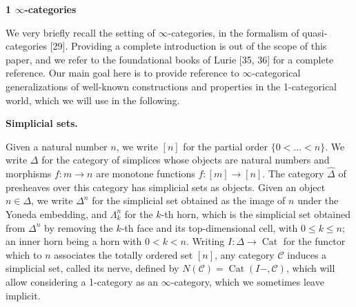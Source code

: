 \documentclass[10pt,a4paper]{article}
\begin{document}
 
 


 
\par\medskip\noindent\textbf{1 $\infty$-categories}\par
 
 
We very briefly recall the setting of $\infty$-categories, in the formalism of quasi-categories [29]. Providing a complete introduction is out of the scope of this paper, and we refer to the foundational books of Lurie [35, 36] for a complete reference. Our main goal here is to provide reference to $\infty$-categorical generalizations of well-known constructions and properties in the 1-categorical world, which we will use in the following.\par
 
 
 
\par\medskip\noindent\textbf{Simplicial sets.}\par
 
 
Given a natural number $n$, we write $[n]$ for the partial order $\{0<\ldots<n\}$. We write $\Delta$ for the category of simplices whose objects are natural numbers and morphisms $f:m\to n$ are monotone functions $f:[m]\to[n]$. The category $\widehat{\Delta}$ of presheaves over this category has simplicial sets as objects. Given an object $n\in\Delta$, we write $\Delta^{n}$ for the simplicial set obtained as the image of $n$ under the Yoneda embedding, and $\Lambda^{n}_{k}$ for the $k$-th horn, which is the simplicial set obtained from $\Delta^{n}$ by removing the $k$-th face and its top-dimensional cell, with $0\leq k\leq n$; an inner horn being a horn with $0<k<n$. Writing $I:\Delta\to\operatorname{Cat}$ for the functor which to $n$ associates the totally ordered set $[n]$, any category $\mathcal{C}$ induces a simplicial set, called its nerve, defined by $N(\mathcal{C})=\operatorname{Cat}(I-,\mathcal{C})$, which will allow considering a 1-category as an $\infty$-category, which we sometimes leave implicit.\par
 
 
 
\end{document}
